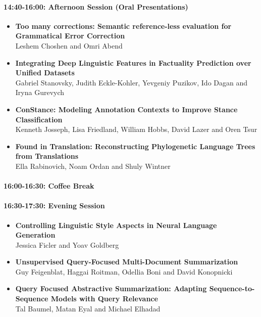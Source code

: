 \documentclass[a0,portrait]{a0poster}
\begin{document}
\paragraph{14:40-16:00: Afternoon Session (Oral
Presentations)}\label{afternoon-session-oral-presentations}

\begin{itemize}
\item
  \textbf{Too many corrections: Semantic reference-less evaluation for
  Grammatical Error Correction}\\
  Leshem Choshen and Omri Abend
\item
  \textbf{Integrating Deep Linguistic Features in Factuality Prediction
  over Unified Datasets}\\
  Gabriel Stanovsky, Judith Eckle-Kohler, Yevgeniy Puzikov, Ido Dagan
  and Iryna Gurevych
\item
  \textbf{ConStance: Modeling Annotation Contexts to Improve Stance
  Classification}\\
  Kenneth Josseph, Lisa Friedland, William Hobbs, David Lazer and Oren
  Tsur
\item
  \textbf{Found in Translation: Reconstructing Phylogenetic Language
  Trees from Translations}\\
  Ella Rabinovich, Noam Ordan and Shuly Wintner
\end{itemize}

\paragraph{16:00-16:30: Coffee Break}\label{coffee-break-1}

\paragraph{16:30-17:30: Evening Session}\label{evening-session}

\begin{itemize}
\item
  \textbf{Controlling Linguistic Style Aspects in Neural Language
  Generation}\\
  Jessica Ficler and Yoav Goldberg
\item
  \textbf{Unsupervised Query-Focused Multi-Document Summarization}\\
  Guy Feigenblat, Haggai Roitman, Odellia Boni and David Konopnicki
\item
  \textbf{Query Focused Abstractive Summarization: Adapting
  Sequence-to-Sequence Models with Query Relevance}\\
  Tal Baumel, Matan Eyal and Michael Elhadad
\end{itemize}
\end{document}
